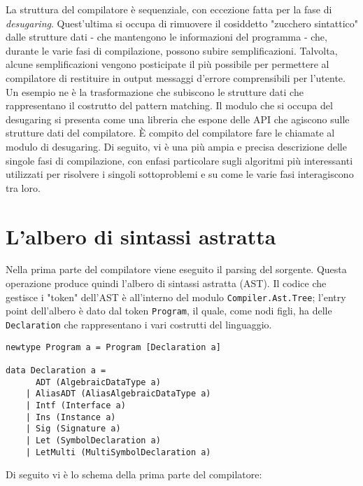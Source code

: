 \documentclass[10pt,a4paper]{article}
\begin{document}
La struttura del compilatore è sequenziale, con eccezione fatta per la fase di \textit{desugaring}. Quest'ultima si
occupa di rimuovere il cosiddetto "zucchero sintattico" dalle strutture dati - che mantengono le informazioni del
programma - che, durante le varie fasi di compilazione, possono subire semplificazioni. Talvolta, alcune semplificazioni
vengono posticipate il più possibile per permettere al compilatore di restituire in output messaggi d'errore comprensibili
per l'utente. Un esempio ne è la trasformazione che subiscono le strutture dati che rappresentano il costrutto del
pattern matching. Il modulo che si occupa del desugaring si presenta come una libreria che espone delle API che agiscono
sulle strutture dati del compilatore. \`E compito del compilatore fare le chiamate al modulo di desugaring. Di seguito,
vi è una più ampia e precisa descrizione delle singole fasi di compilazione, con enfasi particolare sugli algoritmi
più interessanti utilizzati per risolvere i singoli sottoproblemi e su come le varie fasi interagiscono tra loro.

\section{L'albero di sintassi astratta}
Nella prima parte del compilatore viene eseguito il parsing del sorgente.
Questa operazione produce quindi l'albero di sintassi astratta (AST). Il codice che gestisce i "token" dell'AST è
all'interno del modulo \texttt{Compiler.Ast.Tree}; l'entry point dell'albero è dato dal token \texttt{Program}, il
quale, come nodi figli, ha delle \texttt{Declaration} che rappresentano i vari costrutti del linguaggio.

\begin{lstlisting}
newtype Program a = Program [Declaration a]

data Declaration a =
      ADT (AlgebraicDataType a)
    | AliasADT (AliasAlgebraicDataType a)
    | Intf (Interface a)
    | Ins (Instance a)
    | Sig (Signature a)
    | Let (SymbolDeclaration a)
    | LetMulti (MultiSymbolDeclaration a)
\end{lstlisting}

Di seguito vi è lo schema della prima parte del compilatore:
\end{document}
